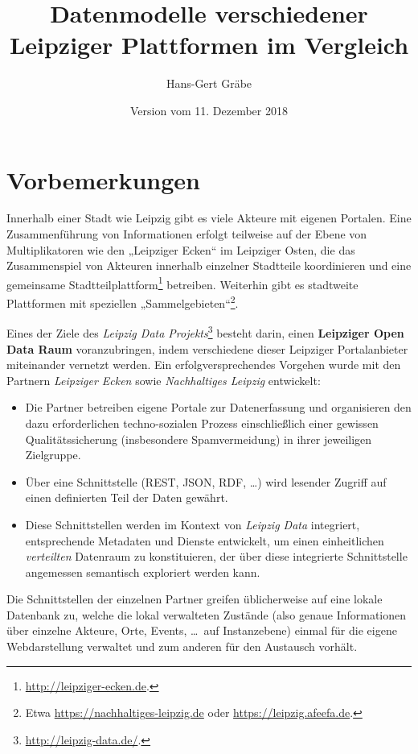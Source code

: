 \documentclass[a4paper,11pt]{article}
\title{Datenmodelle verschiedener\\ Leipziger Plattformen im Vergleich}
\author{Hans-Gert Gräbe}
\date{Version vom 11. Dezember 2018}
\begin{document}
\maketitle
\tableofcontents 
\newpage

\section{Vorbemerkungen}

Innerhalb einer Stadt wie Leipzig gibt es viele Akteure mit eigenen Portalen.
Eine Zusammenführung von Informationen erfolgt teilweise auf der Ebene von
Multiplikatoren wie den „Leipziger Ecken“ im Leipziger Osten, die das
Zusammenspiel von Akteuren innerhalb einzelner Stadtteile koordinieren und
eine gemeinsame Stadtteilplattform\footnote{\url{http://leipziger-ecken.de}.}
betreiben.  Weiterhin gibt es stadtweite Plattformen mit speziellen
„Sammelgebieten“\footnote{Etwa \url{https://nachhaltiges-leipzig.de} oder
\url{https://leipzig.afeefa.de}.}.

Eines der Ziele des \emph{Leipzig Data
  Projekts}\footnote{\url{http://leipzig-data.de/}.} besteht darin, einen
\textbf{Leipziger Open Data Raum} voranzubringen, indem verschiedene dieser
Leipziger Portalanbieter miteinander vernetzt werden. Ein erfolgversprechendes
Vorgehen wurde mit den Partnern \emph{Leipziger Ecken} sowie
\emph{Nachhaltiges Leipzig} entwickelt:
\begin{itemize}
\item [1)] Die Partner betreiben eigene Portale zur Datenerfassung und
  organisieren den dazu erforderlichen techno-sozialen Prozess einschließlich
  einer gewissen Qualitätssicherung (insbesondere Spamvermeidung) in ihrer
  jeweiligen Zielgruppe. 
\item [2)] Über eine Schnittstelle (REST, JSON, RDF, \ldots) wird lesender
  Zugriff auf einen definierten Teil der Daten gewährt.
\item [3)] Diese Schnittstellen werden im Kontext von \emph{Leipzig Data}
  integriert, entsprechende Metadaten und Dienste entwickelt, um einen
  einheitlichen \emph{verteilten} Datenraum zu konstituieren, der über diese
  integrierte Schnittstelle angemessen semantisch exploriert werden kann. 
\end{itemize}
Die Schnittstellen der einzelnen Partner greifen üblicherweise auf eine lokale
Datenbank zu, welche die lokal verwalteten Zustände (also genaue Informationen
über einzelne Akteure, Orte, Events, \ldots\ auf Instanzebene) einmal für die
eigene Webdarstellung verwaltet und zum anderen für den Austausch vorhält. 
\end{document}
